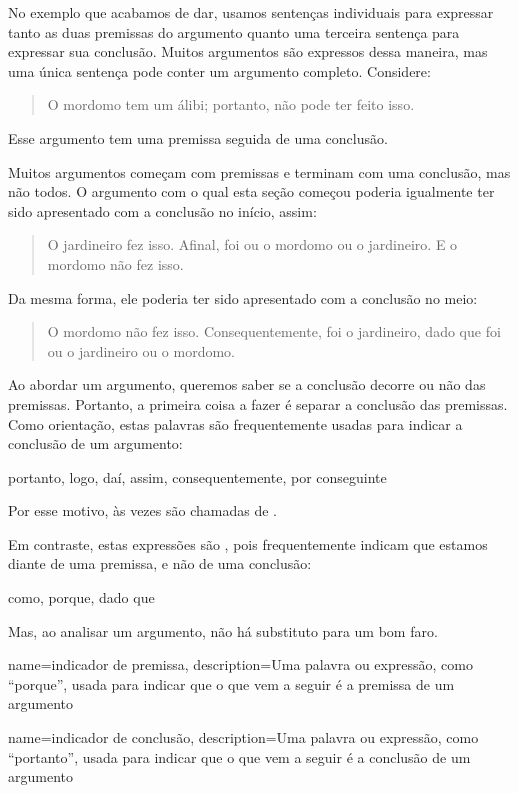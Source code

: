 No exemplo que acabamos de dar, usamos sentenças individuais para expressar tanto as duas premissas do argumento quanto uma terceira sentença para expressar sua conclusão. Muitos argumentos são expressos dessa maneira, mas uma única sentença pode conter um argumento completo. Considere:
	\begin{quote}
		 O mordomo tem um álibi; portanto, não pode ter feito isso.
	\end{quote}
Esse argumento tem uma premissa seguida de uma conclusão.

Muitos argumentos começam com premissas e terminam com uma conclusão, mas não todos. O argumento com o qual esta seção começou poderia igualmente ter sido apresentado com a conclusão no início, assim:
	\begin{quote}
		O jardineiro fez isso. Afinal, foi ou o mordomo ou o
		jardineiro. E o mordomo não fez isso.
	\end{quote}
Da mesma forma, ele poderia ter sido apresentado com a conclusão no meio:
	\begin{quote}
		O mordomo não fez isso. Consequentemente, foi o jardineiro,
		dado que foi ou o jardineiro ou o mordomo.
	\end{quote}
Ao abordar um argumento, queremos saber se a conclusão decorre ou não das premissas. Portanto, a primeira coisa a fazer é separar a conclusão das premissas. Como orientação, estas palavras são frequentemente usadas para indicar a conclusão de um argumento:
	\begin{center}
		portanto, logo, daí, assim, consequentemente, por conseguinte
	\end{center}
Por esse motivo, às vezes são chamadas de .

Em contraste, estas expressões são ,
pois frequentemente indicam que estamos diante de uma premissa, e não de uma
conclusão:
	\begin{center}
		como, porque, dado que
	\end{center}
Mas, ao analisar um argumento, não há substituto para um bom faro.

{
name=indicador de premissa,
description={Uma palavra ou expressão, como \textquotedblleft porque\textquotedblright{}, usada para indicar que o que vem a seguir é a premissa de um argumento}
}

{
name=indicador de conclusão,
description={Uma palavra ou expressão, como \textquotedblleft portanto\textquotedblright{}, usada para indicar que o que vem a seguir é a conclusão de um argumento}
}

